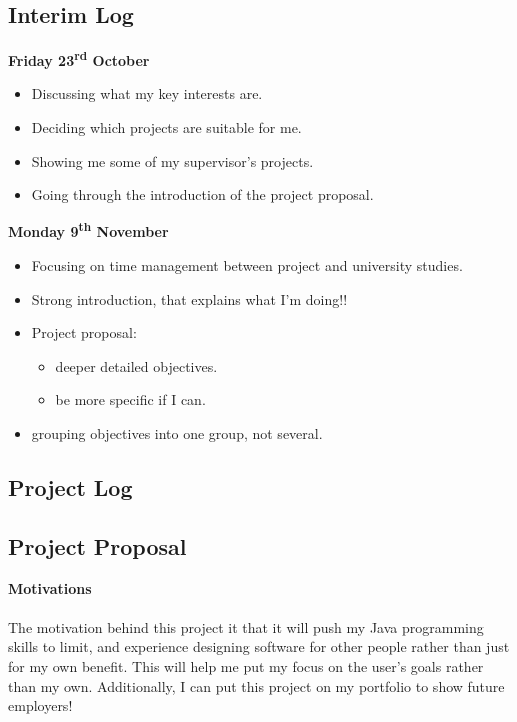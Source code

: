 \documentclass[a4paper, 12pt]{article}
\begin{document}
        \subsection{Interim Log}
            \textbf{Friday 23\textsuperscript{rd} October}
                \begin{itemize}
                    \item Discussing what my key interests are.
                    \item Deciding which projects are suitable for me.
                    \item Showing me some of my supervisor's projects. 
                    \item Going through the introduction of the project proposal. \\
                \end{itemize}
            \textbf{Monday 9\textsuperscript{th} November} 
                \begin{itemize}
                    \item Focusing on time management between project and university
                    studies.
                    \item Strong introduction, that explains what I'm doing!!
                    \item Project proposal:
                    \begin{itemize}
                        \item deeper detailed objectives.
                        \item be more specific if I can.
                    \end{itemize}
                    \item grouping objectives into one group, not several.
                \end{itemize}

    \clearpage
        \subsection{Project Log}
            \textbf{}

        \clearpage
        \subsection{Project Proposal}
            \textbf{Motivations} \\\\    
            The motivation behind this project it that it will push my Java programming
            skills to limit, and experience designing software for other people rather
            than just for my own benefit. This will help me put my focus on the user's
            goals rather than my own. Additionally, I can put this project on my portfolio
            to show future employers!
\end{document}
